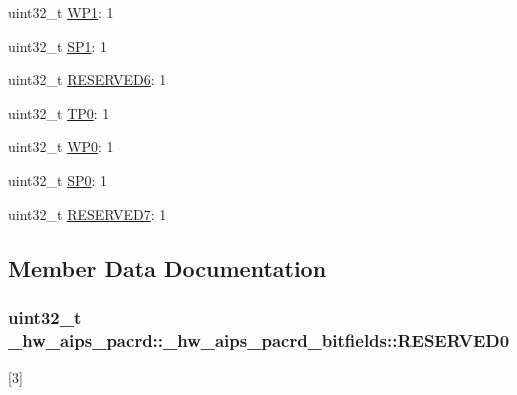 \begin{DoxyCompactItemize}
\item 
uint32\+\_\+t \hyperlink{struct__hw__aips__pacrd_1_1__hw__aips__pacrd__bitfields_af28ec6704cda1270acaf901065ab67cf}{W\+P1}\+: 1
\item 
uint32\+\_\+t \hyperlink{struct__hw__aips__pacrd_1_1__hw__aips__pacrd__bitfields_ab6793d96554119f243c7583f31b62aa3}{S\+P1}\+: 1
\item 
uint32\+\_\+t \hyperlink{struct__hw__aips__pacrd_1_1__hw__aips__pacrd__bitfields_a75ffa21cd8eddeed4a6423fe2668c0c6}{R\+E\+S\+E\+R\+V\+E\+D6}\+: 1
\item 
uint32\+\_\+t \hyperlink{struct__hw__aips__pacrd_1_1__hw__aips__pacrd__bitfields_a28daa37f36001532df59f61e289b1cd9}{T\+P0}\+: 1
\item 
uint32\+\_\+t \hyperlink{struct__hw__aips__pacrd_1_1__hw__aips__pacrd__bitfields_a72c8f541071e5b78ef676170b3fe9dcf}{W\+P0}\+: 1
\item 
uint32\+\_\+t \hyperlink{struct__hw__aips__pacrd_1_1__hw__aips__pacrd__bitfields_ad1de47ebcd1c62d811329e53e2bd34c1}{S\+P0}\+: 1
\item 
uint32\+\_\+t \hyperlink{struct__hw__aips__pacrd_1_1__hw__aips__pacrd__bitfields_ad81488b3ebc5c489934d2b7b29d1747b}{R\+E\+S\+E\+R\+V\+E\+D7}\+: 1
\end{DoxyCompactItemize}


\subsection{Member Data Documentation}
\subsubsection[{\texorpdfstring{R\+E\+S\+E\+R\+V\+E\+D0}{RESERVED0}}]{\setlength{\rightskip}{0pt plus 5cm}uint32\+\_\+t \+\_\+hw\+\_\+aips\+\_\+pacrd\+::\+\_\+hw\+\_\+aips\+\_\+pacrd\+\_\+bitfields\+::\+R\+E\+S\+E\+R\+V\+E\+D0}\hypertarget{struct__hw__aips__pacrd_1_1__hw__aips__pacrd__bitfields_a02fbd6f84dc2ac37358736ac04c2fc69}{}\label{struct__hw__aips__pacrd_1_1__hw__aips__pacrd__bitfields_a02fbd6f84dc2ac37358736ac04c2fc69}
\mbox{[}3\mbox{]} 
